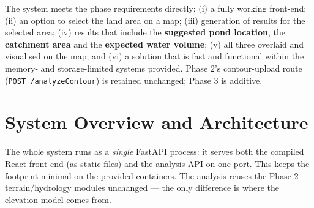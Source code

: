 \documentclass[11pt]{article}
\begin{document}
The system meets the phase requirements directly: (i) a fully working front-end;
(ii) an option to select the land area on a map; (iii) generation of results for the
selected area; (iv) results that include the \textbf{suggested pond location}, the
\textbf{catchment area} and the \textbf{expected water volume}; (v) all three overlaid
and visualised on the map; and (vi) a solution that is fast and functional within the
memory- and storage-limited systems provided. Phase 2's contour-upload route
(\texttt{POST /analyzeContour}) is retained unchanged; Phase 3 is additive.

\section{System Overview and Architecture}

The whole system runs as a \emph{single} FastAPI process: it serves both the compiled
React front-end (as static files) and the analysis API on one port. This keeps the
footprint minimal on the provided containers. The analysis reuses the Phase 2
terrain/hydrology modules unchanged --- the only difference is where the elevation
model comes from.

\begin{center}
\end{center}
\end{document}
